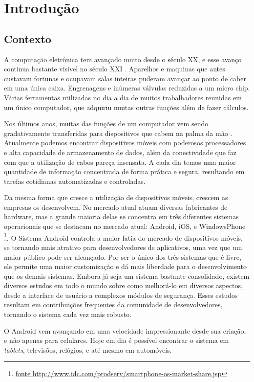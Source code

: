 \chapter{Introdução}
\section{Contexto}
A computação eletrônica tem avançado muito desde o século XX, e esse avanço continua bastante visível no século XXI \cite{histcomputacao2007}. Aparelhos e maquinas que antes custavam fortunas e ocupavam salas inteiras puderam avançar ao ponto de caber em uma única caixa. Engrenagens e inúmeras válvulas reduzidas a um micro chip. Várias ferramentas utilizadas no dia a dia de muitos trabalhadores reunidas em um único computador, que adquiriu muitas outras funções além de fazer cálculos.

Nos últimos anos, muitas das funções de um computador vem sendo gradativamente transferidas para dispositivos que cabem na palma da mão \cite{mobilemassmedia}. Atualmente podemos encontrar dispositivos móveis com poderosos processadores e alta capacidade de armazenamento de dados, além da conectividade que faz com que a utilização de cabos pareça insensata. A cada dia temos uma maior quantidade de informação concentrada de forma prática e segura, resultando em tarefas cotidianas automatizadas e controladas.

Da mesma forma que cresce a utilização de dispositivos móveis, crescem as empresas os desenvolvem. No mercado atual atuam diversas fabricantes de hardware, mas a grande maioria delas se concentra em três diferentes sistemas operacionais que se destacam no mercado atual: Android, iOS, e WindowsPhone \footnote{\url{fonte http://www.idc.com/prodserv/smartphone-os-market-share.jsp}}. O Sistema Android controla a maior fatia do mercado de dispositivos móveis, se tornando mais atrativo para desenvolvedores de aplicativos, uma vez que um maior público pode ser alcançado. Por ser o único dos três sistemas que é livre, ele permite uma maior customização e dá mais liberdade para o desenvolvimento que os demais sistemas. Embora já seja um sistema bastante consolidado, existem diversos estudos em todo o mundo sobre como melhorá-lo em diversos aspectos, desde a interface de usuário a complexos módulos de segurança. Esses estudos resultam em contribuições frequentes da comunidade de desenvolvedores, tornando o sistema cada vez mais robusto.

O Android vem avançando em uma velocidade impressionante desde sua criação, e não apenas para celulares. Hoje em dia é possível encontrar o sistema em \textit{tablets}, televisões, relógios, e até mesmo em automóveis.

